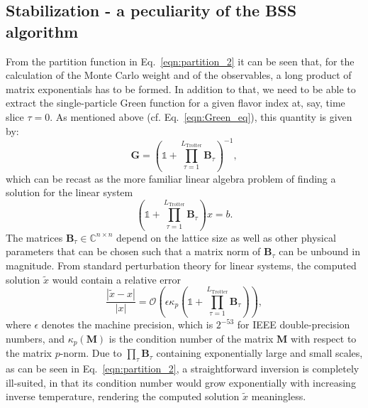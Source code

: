 \subsection{Stabilization - a peculiarity of the BSS algorithm}\label{sec:stable}
%
From the partition function in Eq.~\eqref{eqn:partition_2} it can be seen that, for the calculation of the Monte Carlo weight and of the observables, a long product of matrix exponentials has to be formed.
In addition to that, we need to be able to extract the single-particle Green function  for a given flavor index at, say, time slice $\tau = 0$.  As  mentioned above (cf. Eq.~\eqref{eqn:Green_eq}), this quantity is given by: 
\begin{equation}
\bm{G}= \left( \mathds{1} + \prod_{ \tau= 1}^{L_{\text{Trotter}}} \bm{B}_\tau \right)^{-1},
\end{equation}
which can be recast as the more familiar linear algebra problem of finding a solution for the linear system
\begin{equation}
\left(\mathds{1} + \prod_{\tau=1}^{L_{\text{Trotter}}} \bm{B}_\tau\right) x = b.
\end{equation}
The matrices $\bm{B}_\tau \in \mathbb{C}^{n\times n}$ depend on the lattice size as well as other physical parameters that can be chosen such that a matrix norm of $\bm{B}_\tau$ can be unbound in magnitude.
From standard perturbation theory for linear systems, the computed solution $\tilde{x}$ would 
contain a relative error
\begin{equation}
\frac{|\tilde{x} - x|}{|x|} = \mathcal{O}\left(\epsilon \kappa_p\left(\mathds{1} + \prod_{\tau=1}^{L_{\text{Trotter}}} \bm{B}_\tau\right)\right),
\end{equation}
where $\epsilon$ denotes the machine precision, which is $2^{-53}$ for IEEE double-precision numbers, and $\kappa_p(\bm{M})$ is the condition number of the matrix $\bm{M}$ with respect to the matrix $p$-norm. Due to $\prod_ \tau \bm{B}_\tau$ containing exponentially large and small scales, as can be seen in Eq.~\eqref{eqn:partition_2}, a straightforward inversion is completely ill-suited, in that its condition number would grow exponentially with increasing inverse temperature, rendering the computed solution $\tilde{x}$ meaningless.


